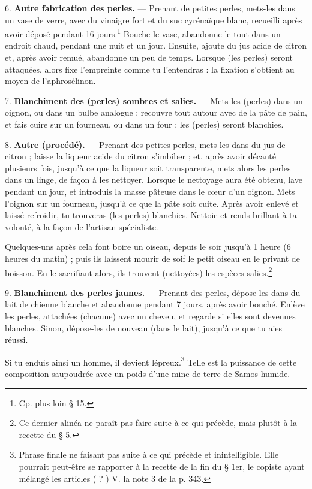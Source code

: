 \documentclass[a4paper, 11pt, oneside, polutonikogreek, french]{article}
\begin{document}
6. \textbf{Autre fabrication des perles.} --- Prenant de petites perles, mets-les dans un vase de verre, avec du vinaigre fort et du suc cyrénaïque blanc, recueilli après avoir déposé pendant 16 jours.\footnote{Cp. plus loin § 15.} Bouche le vase, abandonne le tout dans un endroit chaud, pendant une nuit et un jour. Ensuite, ajoute du jus acide de citron et, après avoir remué, abandonne un peu de temps. Lorsque (les perles) seront attaquées, alors fixe l'empreinte comme tu l'entendras : la fixation s'obtient au moyen de l'aphrosélinon.

7. \textbf{Blanchiment des (perles) sombres et salies.} --- Mets les (perles) dans un oignon, ou dans un bulbe analogue ; recouvre tout autour avec de la pâte de pain, et fais cuire sur un fourneau, ou dans un four : les (perles) seront blanchies.

8. \textbf{Autre (procédé).} --- Prenant des petites perles, mets-les dans du jus de citron ; laisse la liqueur acide du citron s'imbiber ; et, après avoir décanté plusieurs fois, jusqu'à ce que la liqueur soit transparente, mets alors les perles dans un linge, de façon à les nettoyer. Lorsque le nettoyage aura été obtenu, lave pendant un jour, et introduis la masse pâteuse dans le cœur d'un oignon. Mets l'oignon sur un fourneau, jusqu'à ce que la pâte soit cuite. Après avoir enlevé et laissé refroidir, tu trouveras (les perles) blanchies. Nettoie et rends brillant à ta volonté, à la façon de l'artisan spécialiste.

Quelques-uns après cela font boire un oiseau, depuis le soir jusqu'à 1 heure (6 heures du matin) ; puis ils laissent mourir de soif le petit oiseau en le privant de boisson. En le sacrifiant alors, ils trouvent (nettoyées) les espèces salies.\footnote{Ce dernier alinéa ne paraît pas faire suite à ce qui précède, mais plutôt à la recette du § 5.}

9. \textbf{Blanchiment des perles jaunes.} --- Prenant des perles, dépose-les dans du lait de chienne blanche et abandonne pendant 7 jours, après avoir bouché. Enlève les perles, attachées (chacune) avec un cheveu, et regarde si elles sont devenues blanches. Sinon, dépose-les de nouveau (dans le lait), jusqu'à ce que tu aies réussi.

Si tu enduis ainsi un homme, il devient lépreux.\footnote{Phrase finale ne faisant pas suite à ce qui précède et inintelligible. Elle pourrait peut-être se rapporter à la recette de la fin du § 1er, le copiste ayant mélangé les articles ( ? ) V. la note 3 de la p. 343.} Telle est la puissance de cette composition saupoudrée avec un poids d'une mine de terre de Samos humide.
\end{document}
